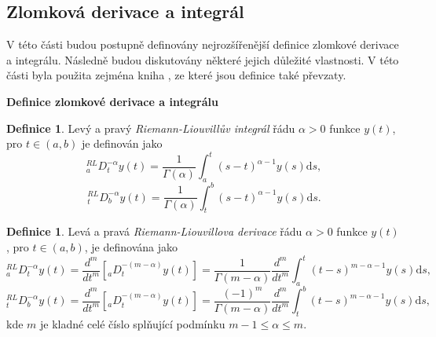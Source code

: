 \documentclass[a4paper,12pt,twoside]{article}
\theoremstyle{definition}
\newtheorem{defin}[veta]{Definice}
\theoremstyle{remark}
\numberwithin{equation}{section}
\numberwithin{table}{section}
\numberwithin{figure}{section}
\newcommand{\dx}[1]{\mathrm{d} #1}
\begin{document}
\subsection{Zlomková derivace a integrál}
	V této části budou postupně definovány nejrozšířenější definice zlomkové derivace a integrálu. Následně budou diskutovány některé jejich důležité vlastnosti. V této části byla použita zejména kniha \cite{Cangpin}, ze které jsou definice také převzaty.
	
\medskip
\noindent\textbf{Definice zlomkové derivace a integrálu}

\begin{defin}
	Levý a pravý \emph{Riemann-Liouvillův integrál} řádu $\alpha > 0$ funkce $y\left(t\right)$, pro $t \in \left(a,b\right)$ je definován jako
	\begin{equation} \label{RiemannIntegral}
	^{RL}_{a}D_{t}^{-\alpha} y\left( t\right)  = \frac{1}{\Gamma \left( \alpha\right)} \int_{a}^{t} \left( s-t \right)^{\alpha -1} y\left( s\right)  \dx s, 
\end{equation}	
	$$ ^{RL}_{t}D_{b}^{-\alpha} y\left( t\right)  = \frac{1}{\Gamma \left( \alpha\right)} \int_{t}^{b} \left( s-t \right)^{\alpha -1} y\left( s\right)  \dx s. $$
\end{defin}

\begin{defin} %
	Levá a pravá \emph{Riemann-Liouvillova derivace} řádu $\alpha > 0 $ funkce $y\left(t\right)$, pro $t \in \left(a, b\right)$, je definována jako
	$$
		{^{RL}_{a}D_{t}^{-\alpha} y\left( t\right)} = \frac{d^{m}}{dt^{m}} \left[_{a}D^{-\left(m-\alpha\right)}_{t} y\left(t\right)\right] = {\frac{1}{\Gamma \left( m -\alpha \right)}} {\frac{d^{m}}{dt^m}} \int_{a}^{t} \left(t-s\right)^{m-\alpha-1} y\left(s\right)\dx{s},
	$$
	$$
	{^{RL}_{t}D_{b}^{-\alpha} y\left( t\right)} = \frac{d^{m}}{dt^{m}} \left[_{a}D^{-\left(m-\alpha\right)}_{t} y\left(t\right)\right] = 		{\frac{\left(-1\right)^{m}}{\Gamma \left( m -\alpha \right)}} {\frac{d^{m}}{dt^m}} \int_{t}^{b} \left(t-s\right)^{m-\alpha-1} y\left(s\right)\dx{s},
	$$
kde $m$ je kladné celé  číslo splňující podmínku $m-1 \leq \alpha \leq m$.
\end{defin}
\end{document}
